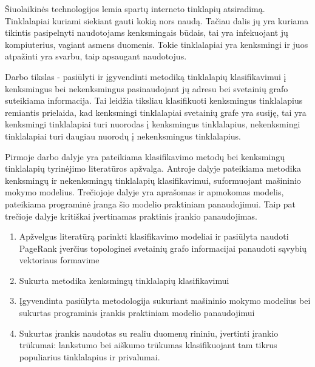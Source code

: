 \documentclass[12pt, a4paper, onecolumn, titlepage, oneside, intlimits]{report}
\begin{document}
\ktuinit{}

\newpage


Šiuolaikinės technologijos lemia spartų interneto tinklapių atsiradimą. Tinklalapiai kuriami siekiant gauti
kokią nors naudą. Tačiau dalis jų yra kuriama tikintis pasipelnyti naudotojams kenksmingais būdais, tai yra
infekuojant jų kompiuterius, vagiant asmens duomenis. Tokie tinklalapiai yra kenksmingi ir juos atpažinti yra
svarbu, taip apsaugant naudotojus.

Darbo tikslas - pasiūlyti ir įgyvendinti metodiką tinklalapių klasifikavimui į kenksmingus bei nekenksmingus
pasinaudojant jų adresu bei svetainių grafo suteikiama informacija. Tai leidžia tiksliau klasifikuoti kenksmingus
tinklalapius remiantis prielaida, kad kenksmingi tinklalapiai svetainių grafe yra susiję, tai yra kenksmingi
tinklalapiai turi nuorodas į kenksmingus tinklalapius, nekenksmingi tinklalapiai turi daugiau nuorodų į nekenksmingus
tinklalapius.

Pirmoje darbo dalyje yra pateikiama klasifikavimo metodų bei kenksmingų tinklalapių tyrinėjimo literatūros apžvalga.
Antroje dalyje pateikiama metodika kenksmingų ir nekenksmingų tinklalapių klasifikavimui, suformuojant mašininio
mokymo modelius. Trečiojoje dalyje yra aprašomas ir apmokomas modelis, pateikiama programinė įranga šio modelio
praktiniam panaudojimui. Taip pat trečioje dalyje kritiškai įvertinamas praktinis įrankio panaudojimas.

\newpage










\newpage




\newpage








\begin{enumerate}[label=\arabic*.]
\item Apžvelgus literatūrą parinkti klasifikavimo modeliai ir pasiūlyta naudoti PageRank
 įverčius topologinei svetainių grafo informacijai panaudoti sąvybių vektoriaus formavime
\item Sukurta metodika kenksmingų tinklalapių klasifikavimui
\item Įgyvendinta pasiūlyta metodologija sukuriant mašininio mokymo modelius bei sukurtas
 programinis įrankis praktiniam modelio panaudojimui
\item Sukurtas įrankis naudotas su realiu duomenų rininiu, įvertinti įrankio trūkumai:
lankstumo bei aiškumo trūkumas klasifikuojant tam tikrus populiarius tinklalapius ir privalumai.
\end{enumerate}
\end{document}

